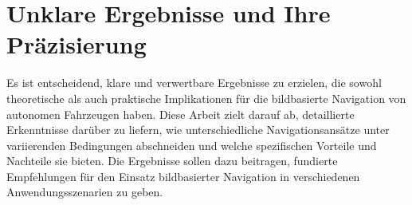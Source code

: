 \section{Unklare Ergebnisse und Ihre Präzisierung}

Es ist entscheidend, klare und verwertbare Ergebnisse zu erzielen, die sowohl theoretische als auch praktische Implikationen für die bildbasierte Navigation von autonomen Fahrzeugen haben. 
Diese Arbeit zielt darauf ab, detaillierte Erkenntnisse darüber zu liefern, wie unterschiedliche Navigationsansätze unter variierenden Bedingungen abschneiden und welche spezifischen Vorteile und Nachteile sie bieten. 
Die Ergebnisse sollen dazu beitragen, fundierte Empfehlungen für den Einsatz bildbasierter Navigation in verschiedenen Anwendungsszenarien zu geben.
